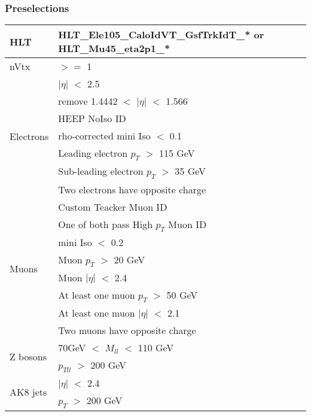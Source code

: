 \documentclass{beamer}
\begin{document}
\begin{frame}
  \frametitle{Preselections}
  \begin{center}
    \begin{tiny}
      \begin{tabular}[t]{ | l | l | }
        \hline
        HLT       
        & HLT\_Ele105\_CaloIdVT\_GsfTrkIdT\_* or HLT\_Mu45\_eta2p1\_*  \\
        \hline
        nVtx 
        & $>=$ 1                                         \\
        \hline
        \multirow{7}{*}{Electrons} 
        & $|\eta|$ $<$ 2.5                               \\
        & remove 1.4442 $<$ $|\eta|$ $<$ 1.566           \\
        & HEEP NoIso ID                                  \\
        & rho-corrected mini Iso $<$ 0.1                 \\
        & Leading electron $p_T$ $>$ 115 GeV             \\
        & Sub-leading electron $p_T$ $>$ 35 GeV          \\
        & Two electrons have opposite charge             \\
        \hline
        \multirow{8}{*}{Muons}
        & Custom Teacker Muon ID                         \\ 
        & One of both pass High $p_T$ Muon ID            \\
        & mini Iso $<$ 0.2                               \\
        & Muon $p_T$ $>$ 20 GeV                          \\
        & Muon $|\eta|$ $<$ 2.4                          \\
        & At least one muon $p_T$ $>$ 50 GeV             \\
        & At least one muon $|\eta|$ $<$ 2.1             \\
        & Two muons have opposite charge                 \\
        \hline
        \multirow{2}{*}{Z bosons}
        & 70GeV $<$ $M_{ll}$ $<$ 110 GeV                 \\
        & $p_{Tll}$ $>$ 200 GeV                          \\
        \hline
        \multirow{6}{*}{AK8 jets}
        & $|\eta|$ $<$ 2.4                               \\ 
        & $p_T$ $>$ 200 GeV                              \\

\end{tabular}
\end{tiny}
\end{center}
\end{frame}
\end{document}

